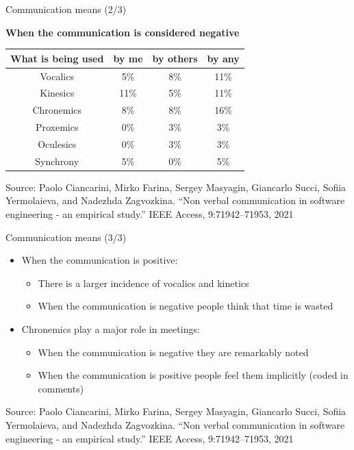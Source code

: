 \documentclass{beamer}
\begin{document}
\begin{frame}
{\centerline{Communication means (2/3)}}

\begin{center}
\textbf{When the communication is considered negative}
\end{center}

\begin{center}
\centering
\begin{tabular}{|c|c|c|c|}
\midrule
{\textbf{What is being used}} & {\textbf{by me}} & \textbf{by others} & \textbf{by any}\\
\midrule
{Vocalics} & 5\% & 8\% & 11\% \\
\midrule
{Kinesics} & 11\% & 5\% & 11\% \\
\midrule
{Chronemics} & 8\% & 8\% & 16\%\\
\midrule
{Proxemics} & 0\% & 3\% & 3\%\\
\midrule
{Oculesics} &  0\% & 3\% & 3\%\\
\midrule
 {Synchrony} & 5\% & 0\% & 5\%\\
\midrule
\end{tabular}
\end{center}

\begin{center}
    \tiny{Source: Paolo Ciancarini, Mirko Farina, Sergey Masyagin, Giancarlo Succi, Sofiia Yermolaieva, and Nadezhda Zagvozkina. ``Non verbal communication in software engineering - an empirical study.'' IEEE Access, 9:71942–71953, 2021}
\end{center}

\end{frame}


\begin{frame}
{\centerline{Communication means (3/3)}}

\begin{itemize}
\item When the communication is positive:
\begin{itemize}
\item There is a larger incidence of vocalics and kinetics
\item When the communication is negative people think that time is wasted 
\end{itemize}
\item Chronemics play a major role in meetings:
\begin{itemize}
\item When the communication is negative they are remarkably noted 
\item When the communication is positive people feel them implicitly (coded in comments)
\end{itemize}

\end{itemize}

\begin{center}
    \tiny{Source: Paolo Ciancarini, Mirko Farina, Sergey Masyagin, Giancarlo Succi, Sofiia Yermolaieva, and Nadezhda Zagvozkina. ``Non verbal communication in software engineering - an empirical study.'' IEEE Access, 9:71942–71953, 2021}
\end{center}

\end{frame}
\end{document}
